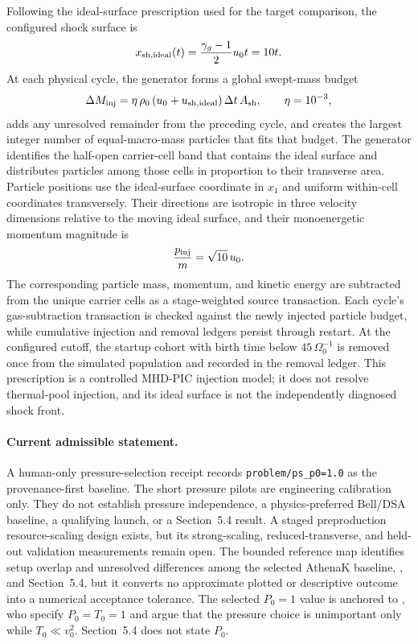 \documentclass[twocolumn]{aastex701}
\begin{document}
Following the ideal-surface prescription used for the target comparison, the
configured shock surface is
\begin{equation}
x_{\rm sh,ideal}(t)=\frac{\gamma_g-1}{2}u_0t=10t .
\label{eq:ideal-shock-surface}
\end{equation}
At each physical cycle, the generator forms a global swept-mass budget
\begin{equation}
\Delta M_{\rm inj}
=\eta\,\rho_0\left(u_0+u_{\rm sh,ideal}\right)
\Delta t\,A_{\rm sh},
\qquad \eta=10^{-3},
\label{eq:shock-injected-mass}
\end{equation}
adds any unresolved remainder from the preceding cycle, and creates the
largest integer number of equal-macro-mass particles that fits that budget.
The generator identifies the half-open carrier-cell band that contains the
ideal surface and distributes particles among those cells in proportion to
their transverse area. Particle positions use the ideal-surface coordinate in
$x_1$ and uniform within-cell coordinates transversely. Their directions are
isotropic in three velocity dimensions relative to the moving ideal surface,
and their monoenergetic momentum magnitude is
\begin{equation}
\frac{p_{\rm inj}}{m}=\sqrt{10}\,u_0 .
\label{eq:shock-injection-momentum}
\end{equation}
The corresponding particle mass, momentum, and kinetic energy are subtracted
from the unique carrier cells as a stage-weighted source transaction. Each
cycle's gas-subtraction transaction is checked against the newly injected
particle budget, while cumulative injection and removal ledgers persist through
restart. At the configured cutoff, the startup cohort with birth time below
$45\,\Omega_0^{-1}$ is removed once from the simulated population and recorded
in the removal ledger. This prescription is a controlled MHD-PIC injection
model; it does not resolve thermal-pool injection, and its ideal surface is not
the independently diagnosed shock front.

\paragraph{Current admissible statement.}
A human-only pressure-selection receipt records
\texttt{problem/ps\_p0=1.0} as the provenance-first baseline. The short pressure
pilots are engineering calibration only. They do not establish pressure
independence, a physics-preferred Bell/DSA baseline, a qualifying launch, or a
Section~5.4 result. A staged preproduction resource-scaling design exists, but
its strong-scaling, reduced-transverse, and held-out validation measurements
remain open. The bounded reference map identifies setup overlap and unresolved
differences among the selected AthenaK baseline, \citet{BaiEtAl2015}, and
\citet{SunBai2023} Section~5.4, but it converts no approximate plotted or
descriptive outcome into a numerical acceptance tolerance. The selected
$P_0=1$ value is anchored to \citet{BaiEtAl2015}, who specify $P_0=T_0=1$ and
argue that the pressure choice is unimportant only while $T_0\ll v_0^2$.
\citet{SunBai2023} Section~5.4 does not state $P_0$.
\end{document}
